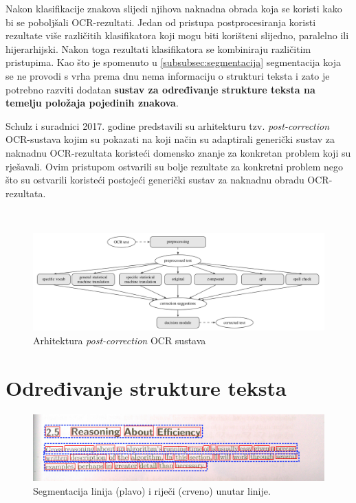 \documentclass[times, utf8, zavrsni]{fer}
\begin{document}
Nakon klasifikacije znakova slijedi njihova naknadna obrada koja se koristi kako
bi se poboljšali OCR-rezultati. Jedan od pristupa postprocesiranja koristi rezultate
više različitih klasifikatora koji mogu biti korišteni slijedno, paralelno ili hijerarhijski.
Nakon toga rezultati klasifikatora se kombiniraju različitim pristupima. \citep{DBLP:journals/corr/abs-1710-05703}
Kao što je spomenuto u \ref{subsubsec:segmentacija} segmentacija koja se ne provodi s vrha prema
dnu nema informaciju o strukturi teksta i zato je potrebno razviti dodatan
\textbf{sustav za određivanje strukture teksta na temelju položaja pojedinih znakova}.

Schulz i suradnici \citep{schulz2017multi} 2017. godine predstavili su arhitekturu
tzv. \emph{post-correction} OCR-sustava kojim su pokazati na koji način su
adaptirali generički sustav za naknadnu OCR-rezultata koristeći domensko znanje
za konkretan problem koji su rješavali. Ovim pristupom ostvarili su bolje rezultate
za konkretni problem nego što su ostvarili koristeći postojeći generički sustav za
naknadnu obradu OCR-rezultata.

\

\begin{figure}[htb]
    \centering
    \includegraphics[width=\textwidth]{images/post-correction-example-01.png}
    \caption{Arhitektura \emph{post-correction} OCR sustava \citep{schulz2017multi}}
    \label{fig:post-correction-example-01}
\end{figure}

\chapter{Određivanje strukture teksta}

\begin{figure}[htb]
    \centering
    \includegraphics[width=\textwidth]{images/text-segmentation-01.jpg}
    \caption{Segmentacija linija (plavo) i riječi (crveno) unutar linije.}
    \label{fig:text-segmentation-01}
\end{figure}
\end{document}
